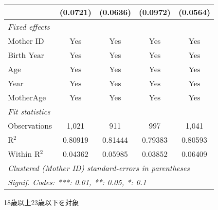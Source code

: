 \documentclass{article}
\begin{document}
\begin{landscape}
\begin{threeparttable}[b]
\begin{tabular}{lcccc}
                                                                   & (0.0721)       & (0.0636)        & (0.0972)      & (0.0564)\\   
      \midrule
      \emph{Fixed-effects}\\
      Mother ID                                                    & Yes            & Yes             & Yes           & Yes\\  
      Birth Year                                                   & Yes            & Yes             & Yes           & Yes\\  
      Age                                                          & Yes            & Yes             & Yes           & Yes\\  
      Year                                                         & Yes            & Yes             & Yes           & Yes\\  
      MotherAge                                                    & Yes            & Yes             & Yes           & Yes\\  
      \midrule
      \emph{Fit statistics}\\
      Observations                                                 & 1,021          & 911             & 997           & 1,041\\  
      R$^2$                                                        & 0.80919        & 0.81444         & 0.79383       & 0.80593\\  
      Within R$^2$                                                 & 0.04362        & 0.05985         & 0.03852       & 0.06409\\  
      \midrule \midrule
      \multicolumn{5}{l}{\emph{Clustered (Mother ID) standard-errors in parentheses}}\\
      \multicolumn{5}{l}{\emph{Signif. Codes: ***: 0.01, **: 0.05, *: 0.1}}\\
   \end{tabular}
   
   \begin{tablenotes}\item 18歳以上23歳以下を対象
   \end{tablenotes}
\end{threeparttable}
\par\endgroup


\end{landscape}
\end{document}

